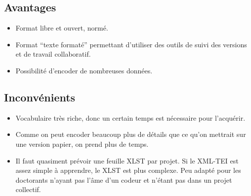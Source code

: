 \documentclass{article}
\begin{document}
\subsection{Avantages}
\begin{itemize}
	\item Format libre et ouvert, normé.
	\item Format \enquote{texte formaté} permettant d'utiliser des outils de suivi des versions et de travail collaboratif.
	\item Possibilité d'encoder de nombreuses données.
\end{itemize}

\subsection{Inconvénients}
\begin{itemize}
	\item Vocabulaire très riche, donc un certain temps est nécessaire pour l'acquérir.
	\item Comme on peut encoder beaucoup plus de détails que ce qu'on mettrait sur une version papier, on prend plus de temps.
	\item Il faut quasiment prévoir une feuille XLST par projet. Si le XML-TEI est assez simple à apprendre, le XLST est plus complexe. Peu adapté pour les doctorants n'ayant pas l'âme d'un codeur et n'étant pas dans un projet collectif.
\end{itemize}
\end{document}
